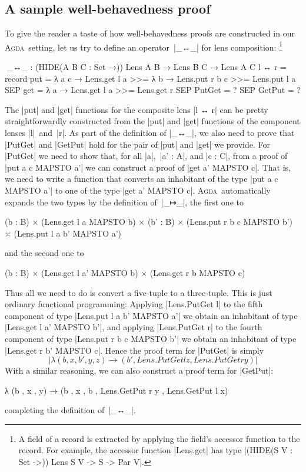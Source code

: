 \documentclass{sigplanconf}
\newcommand{\ucomma}{\kern1pt, }
\newcommand{\uperiod}{\kern1pt. }
\newcommand{\Agda}{\textsc{Agda}}
\begin{document}
\subsection{A sample well-behavedness proof}
\label{sec:sample-well-behavedness-proof}

To give the reader a taste of how well-behavedness proofs are constructed in our \Agda\ setting, let us try to define an operator~|_↔_| for lens composition:%
\footnote{A field of a record is extracted by applying the field's accessor function to the record.
For example, the accessor function |Lens.get| has type |(HIDE({S V : Set} ->)) Lens S V -> S -> Par V|.}
\begin{code}
^^^_↔_ : (HIDE({A B C : Set} →)) Lens A B → Lens B C → Lens A C
l ↔ r = record
  {    put  =  λ a c →  Lens.get l a >>= λ b →
                        Lens.put r b c >>= Lens.put l a
  SEP  get  = λ a → Lens.get l a >>= Lens.get r
  SEP  PutGet = ? SEP GetPut = ? }
\end{code}
The |put| and |get| functions for the composite lens |l ↔ r| can be pretty straightforwardly constructed from the |put| and |get| functions of the component lenses |l|~and~|r|.
As part of the definition of |_↔_|\ucomma we also need to prove that |PutGet| and |GetPut| hold for the pair of |put| and |get| we provide.
For |PutGet| we need to show that, for all |a|,~|a' : A|, and |c : C|, from a proof of |put a c MAPSTO a'| we can construct a proof of |get a' MAPSTO c|.
That is, we need to write a function that converts an inhabitant of the type |put a c MAPSTO a'| to one of the type |get a' MAPSTO c|.
\Agda\ automatically expands the two types by the definition of~|_↦_|\ucomma the first one to
\begin{code}
(b : B) × (Lens.get l a MAPSTO b) ×
  (b' : B) × (Lens.put r b c MAPSTO b') × (Lens.put l a b' MAPSTO a')
\end{code}
and the second one to
\begin{code}
(b : B) × (Lens.get l a' MAPSTO b) × (Lens.get r b MAPSTO c)
\end{code}
Thus all we need to do is convert a five-tuple to a three-tuple.
This is just ordinary functional programming: Applying |Lens.PutGet l| to the fifth component of type |Lens.put l a b' MAPSTO a'| we obtain an inhabitant of type |Lens.get l a' MAPSTO b'|, and applying |Lens.PutGet r| to the fourth component of type |Lens.put r b c MAPSTO b'| we obtain an inhabitant of type |Lens.get r b' MAPSTO c|.
Hence the proof term for |PutGet| is simply
\begin{equation}
|λ { (b , x , b' , y , z) → (b' , Lens.PutGet l z , Lens.PutGet r y) }|
\tag{$*$}
\label{lambda-expression}
\end{equation}
With a similar reasoning, we can also construct a proof term for |GetPut|:
\begin{code}
λ { (b , x , y) → (b , x , b , Lens.GetPut r y , Lens.GetPut l x) }
\end{code}
completing the definition of~|_↔_|\uperiod
\end{document}
